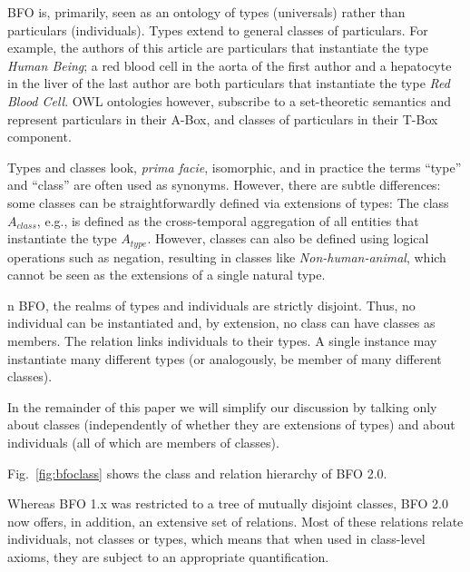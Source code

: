 BFO is, primarily, seen as an ontology of types (universals) rather than particulars (individuals). 
Types extend to general classes of particulars. For example, the authors of this article are particulars that instantiate the type \emph{Human Being}; a red blood cell in the aorta of the first author and a hepatocyte in the liver of the last author are both particulars that instantiate the type \emph{Red Blood Cell}. 
OWL ontologies however, subscribe to a set-theoretic semantics and represent particulars in their A-Box, and classes of particulars in their T-Box component. 

Types and classes look, \emph{prima facie}, isomorphic, and in practice the terms ``type'' and ``class'' are often used as synonyms. However, there are subtle differences: 
some classes can be straightforwardly defined via extensions of types: The class $A_{class}$, e.g., is defined as the cross-temporal  aggregation of all entities that instantiate the 
type $A_{type}$. However, classes can also be defined using logical operations such as negation, 
resulting in classes like \emph{Non-human-animal}, which cannot be seen as the extensions of a single natural type.  

n BFO, the realms of types and individuals are strictly disjoint.
Thus, no individual can be instantiated and, by extension, no class can have classes as members.  
The relation  links individuals to their types. A single instance may instantiate many different types (or analogously, be member of many different classes). 

In the remainder of this paper we will simplify our discussion by talking only about classes (independently of whether they are extensions of types) and about individuals (all of which are members of classes).  

Fig.\ \ref{fig:bfoclass} shows the class and relation hierarchy of BFO 2.0.  


 
Whereas BFO 1.x was restricted to a tree of mutually disjoint classes, BFO 2.0 now offers, in addition, an extensive set of relations. 
Most of these relations relate individuals, not classes or types, which means that when used in class-level axioms, they are 
subject to an appropriate quantification. 



